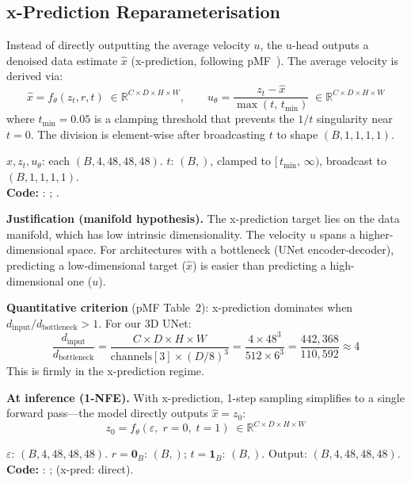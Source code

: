 \subsection{x-Prediction Reparameterisation}
\label{sec:xpred}

Instead of directly outputting the average velocity $u$, the u-head outputs a
denoised data estimate $\hat{x}$ (x-prediction, following pMF~\cite{pmf}).
The average velocity is derived via:
\begin{equation}
  \hat{x} = f_\theta(z_t,r,t)
    \;\in \mathbb{R}^{C \times D \times H \times W},
  \qquad
  u_\theta = \frac{z_t - \hat{x}}{\max(t,\,t_{\min})}
    \;\in \mathbb{R}^{C \times D \times H \times W}
  \label{eq:xpred}
\end{equation}
where $t_{\min} = 0.05$ is a clamping threshold that prevents the $1/t$
singularity near $t = 0$.  The division is element-wise after broadcasting
$t$ to shape $(B, 1, 1, 1, 1)$.
\begin{shapes}
$\hat{x}, z_t, u_\theta$: each $(B, 4, 48, 48, 48)$.
\quad $t$: $(B,)$, clamped to $[\,t_{\min},\,\infty)$, broadcast to $(B,1,1,1,1)$.\\
\textbf{Code:} :
;
.
\end{shapes}

\textbf{Justification (manifold hypothesis).}  The x-prediction target lies on
the data manifold, which has low intrinsic dimensionality.  The velocity $u$
spans a higher-dimensional space.  For architectures with a bottleneck (UNet
encoder-decoder), predicting a low-dimensional target ($\hat{x}$) is easier
than predicting a high-dimensional one ($u$).

\textbf{Quantitative criterion} (pMF Table~2): x-prediction dominates when
$d_{\mathrm{input}}/d_{\mathrm{bottleneck}} > 1$.  For our 3D UNet:
\begin{equation}
  \frac{d_{\mathrm{input}}}{d_{\mathrm{bottleneck}}}
    = \frac{C \times D \times H \times W}{\text{channels}[3] \times (D/8)^3}
    = \frac{4 \times 48^3}{512 \times 6^3}
    = \frac{442{,}368}{110{,}592} \approx 4
\end{equation}
This is firmly in the x-prediction regime.

\textbf{At inference (1-NFE).}  With x-prediction, 1-step sampling simplifies
to a single forward pass---the model directly outputs $\hat{x} = z_0$:
\begin{equation}
  z_0 = f_\theta(\varepsilon,\;r{=}0,\;t{=}1)
    \;\in \mathbb{R}^{C \times D \times H \times W}
  \label{eq:1nfe_xpred}
\end{equation}
\begin{shapes}
$\varepsilon$: $(B, 4, 48, 48, 48)$.
\quad $r = \mathbf{0}_B$: $(B,)$; $t = \mathbf{1}_B$: $(B,)$.
\quad Output: $(B, 4, 48, 48, 48)$.\\
\textbf{Code:} :
;  (x-pred: direct).
\end{shapes}